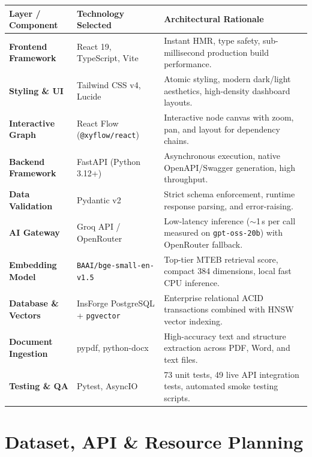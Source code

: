 \documentclass[11pt,a4paper]{article}
\begin{document}
\noindent
\begin{tabularx}{\textwidth}{@{}l p{3.6cm} X@{}}
\toprule
\textbf{Layer / Component} & \textbf{Technology Selected} & \textbf{Architectural Rationale} \\
\midrule
\textbf{Frontend Framework} & React 19, TypeScript, Vite & Instant HMR, type safety, sub-millisecond production build performance. \\
\textbf{Styling \& UI} & Tailwind CSS v4, Lucide & Atomic styling, modern dark/light aesthetics, high-density dashboard layouts. \\
\textbf{Interactive Graph} & React Flow (\texttt{@xyflow/react}) & Interactive node canvas with zoom, pan, and layout for dependency chains. \\
\textbf{Backend Framework} & FastAPI (Python 3.12+) & Asynchronous execution, native OpenAPI/Swagger generation, high throughput. \\
\textbf{Data Validation} & Pydantic v2 & Strict schema enforcement, runtime response parsing, and error-raising. \\
\textbf{AI Gateway} & Groq API / OpenRouter & Low-latency inference ($\sim$1\,s per call measured on \texttt{gpt-oss-20b}) with OpenRouter fallback. \\
\textbf{Embedding Model} & \texttt{BAAI/bge-small-en-v1.5} & Top-tier MTEB retrieval score, compact 384 dimensions, local fast CPU inference. \\
\textbf{Database \& Vectors} & InsForge PostgreSQL + \texttt{pgvector} & Enterprise relational ACID transactions combined with HNSW vector indexing. \\
\textbf{Document Ingestion} & pypdf, python-docx & High-accuracy text and structure extraction across PDF, Word, and text files. \\
\textbf{Testing \& QA} & Pytest, AsyncIO & 73 unit tests, 49 live API integration tests, automated smoke testing scripts. \\
\bottomrule
\end{tabularx}

\section{Dataset, API \& Resource Planning}
\end{document}
